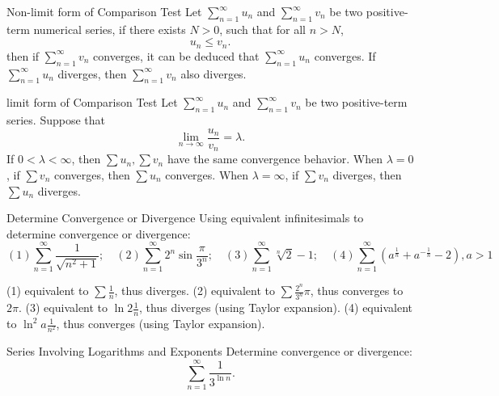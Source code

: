 \begin{theorem}{Non-limit form of Comparison Test}{}
  Let $\sum\limits_{n = 1}^{\infty} u_n$ and $\sum\limits_{n = 1}^{\infty}v_n$
  be two positive-term numerical series,
  if there exists $N > 0$, such that for all $n > N$,
  \begin{equation}
    u_n \leq v_n.
  \end{equation}
  then if $\sum\limits_{n = 1}^{\infty} v_n$ converges,
  it can be deduced that $\sum\limits_{n = 1}^{\infty}u_n$ converges.
  If $\sum\limits_{n = 1}^{\infty}u_n$ diverges,
  then $\sum\limits_{n = 1}^{\infty}v_n$ also diverges.
\end{theorem}

\begin{theorem}{limit form of Comparison Test}{}
  Let $\sum\limits_{n = 1}^{\infty} u_n$ and $\sum\limits_{n = 1}^{\infty}v_n$
  be two positive-term series.
  Suppose that
  \begin{equation}
    \lim \limits _{n \rightarrow \infty} \frac{u_n}{v_n} = \lambda.
  \end{equation}
  If $0 < \lambda < \infty$,
  then $\sum u_n, \sum v_n$ have the same convergence behavior.
  When $\lambda = 0$, if $\sum v_n$ converges,
  then $\sum u_n$ converges.
  When $\lambda = \infty$, if $\sum v_n$ diverges,
  then $\sum u_n$ diverges.
\end{theorem}

\begin{example}{Determine Convergence or Divergence}{}
  Using equivalent infinitesimals to determine convergence or divergence:
  \begin{equation}
    (1) \sum\limits_{n = 1}^{\infty} \frac{1}{\sqrt{n^2 + 1}}; \quad
    (2) \sum\limits_{n = 1}^{\infty} 2^n \sin \frac{\pi}{3^n}; \quad
    (3) \sum\limits_{n = 1}^{\infty} \sqrt[n]{2} - 1; \quad
    (4) \sum\limits_{n = 1}^{\infty} (a^{\frac{1}{n}} + a^{- \frac{1}{n}} - 2), a > 1
  \end{equation}
\end{example}

\begin{solution}
  (1) equivalent to $\sum \frac{1}{n}$, thus diverges.
  (2) equivalent to $\sum \frac{2^n}{3^n}\pi$, thus converges to $2\pi$.
  (3) equivalent to $\ln 2 \frac{1}{n}$, thus diverges (using Taylor expansion).
  (4) equivalent to $\ln^2 a \frac{1}{n^2}$, thus converges (using Taylor expansion).
\end{solution}

\begin{example}{Series Involving Logarithms and Exponents}{}
  Determine convergence or divergence:
  \begin{equation}
    \sum\limits_{n = 1}^{\infty} \frac{1}{3^{\ln n}}.
  \end{equation}
\end{example}

